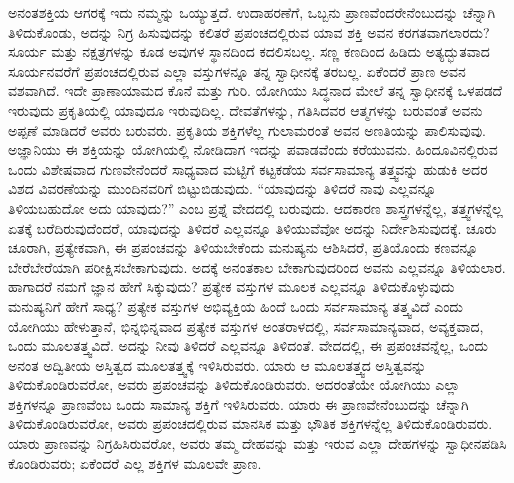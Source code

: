 ಅನಂತಶಕ್ತಿಯ ಆಗರಕ್ಕೆ ಇದು ನಮ್ಮನ್ನು ಒಯ್ಯುತ್ತದೆ. ಉದಾಹರಣೆಗೆ, ಒಬ್ಬನು ಪ್ರಾಣವೆಂದರೇನೆಂಬುದನ್ನು ಚೆನ್ನಾಗಿ ತಿಳಿದುಕೊಂಡು, ಅದನ್ನು ನಿಗ್ರ ಹಿಸುವುದನ್ನು ಕಲಿತರೆ ಪ್ರಪಂಚದಲ್ಲಿರುವ ಯಾವ ಶಕ್ತಿ ಅವನ ಕರಗತವಾಗಲಾರದು? ಸೂರ್ಯ ಮತ್ತು ನಕ್ಷತ್ರಗಳನ್ನು ಕೂಡ ಅವುಗಳ ಸ್ಥಾನದಿಂದ ಕದಲಿಸಬಲ್ಲ. ಸಣ್ಣ ಕಣದಿಂದ ಹಿಡಿದು ಅತ್ಯದ್ಭುತವಾದ ಸೂರ್ಯನವರೆಗೆ ಪ್ರಪಂಚದಲ್ಲಿರುವ ಎಲ್ಲಾ ವಸ್ತುಗಳನ್ನೂ ತನ್ನ ಸ್ವಾಧೀನಕ್ಕೆ ತರಬಲ್ಲ. ಏಕೆಂದರೆ ಪ್ರಾಣ ಅವನ ವಶವಾಗಿದೆ. ಇದೇ ಪ್ರಾಣಾಯಾಮದ ಕೊನೆ ಮತ್ತು ಗುರಿ. ಯೋಗಿಯು ಸಿದ್ಧನಾದ ಮೇಲೆ ತನ್ನ ಸ್ವಾಧೀನಕ್ಕೆ ಒಳಪಡದೆ ಇರುವುದು ಪ್ರಕೃತಿಯಲ್ಲಿ ಯಾವುದೂ ಇರುವುದಿಲ್ಲ. ದೇವತೆಗಳನ್ನು, ಗತಿಸಿದವರ ಆತ್ಮಗಳನ್ನು ಬರುವಂತೆ ಅವನು ಅಪ್ಪಣೆ ಮಾಡಿದರೆ ಅವರು ಬರುವರು. ಪ್ರಕೃತಿಯ ಶಕ್ತಿಗಳೆಲ್ಲ ಗುಲಾಮರಂತೆ ಅವನ ಅಣತಿಯನ್ನು ಪಾಲಿಸುವುವು. ಅಜ್ಞಾನಿಯು ಈ ಶಕ್ತಿಯನ್ನು ಯೋಗಿಯಲ್ಲಿ ನೋಡಿದಾಗ ಇದನ್ನು ಪವಾಡವೆಂದು ಕರೆಯುವನು. ಹಿಂದೂವಿನಲ್ಲಿರುವ ಒಂದು ವಿಶೇಷವಾದ ಗುಣವೇನೆಂದರೆ ಸಾಧ್ಯವಾದ ಮಟ್ಟಿಗೆ ಕಟ್ಟಕಡೆಯ ಸರ್ವಸಾಮಾನ್ಯ ತತ್ತ್ವವನ್ನು ಹುಡುಕಿ ಅದರ ವಿಶದ ವಿವರಣೆಯನ್ನು ಮುಂದಿನವರಿಗೆ ಬಿಟ್ಟುಬಿಡುವುದು. “ಯಾವುದನ್ನು ತಿಳಿದರೆ ನಾವು ಎಲ್ಲವನ್ನೂ ತಿಳಿಯಬಹುದೋ ಅದು ಯಾವುದು?” ಎಂಬ ಪ್ರಶ್ನೆ ವೇದದಲ್ಲಿ ಬರುವುದು. ಆದಕಾರಣ ಶಾಸ್ತ್ರಗಳನ್ನೆಲ್ಲ, ತತ್ತ್ವಗಳನ್ನೆಲ್ಲ ಏತಕ್ಕೆ ಬರೆದಿರುವುದೆಂದರೆ, ಯಾವುದನ್ನು ತಿಳಿದರೆ ಎಲ್ಲವನ್ನೂ ತಿಳಿಯುವೆವೋ ಅದನ್ನು ನಿರ್ದೇಶಿಸುವುದಕ್ಕೆ. ಚೂರು ಚೂರಾಗಿ, ಪ್ರತ್ಯೇಕವಾಗಿ, ಈ ಪ್ರಪಂಚವನ್ನು ತಿಳಿಯಬೇಕೆಂದು ಮನುಷ್ಯನು ಆಶಿಸಿದರೆ, ಪ್ರತಿಯೊಂದು ಕಣವನ್ನೂ ಬೇರೆಬೇರೆಯಾಗಿ ಪರೀಕ್ಷಿಸಬೇಕಾಗುವುದು. ಅದಕ್ಕೆ ಅನಂತಕಾಲ ಬೇಕಾಗುವುದರಿಂದ ಅವನು ಎಲ್ಲವನ್ನೂ ತಿಳಿಯಲಾರ. ಹಾಗಾದರೆ ನಮಗೆ ಜ್ಞಾನ ಹೇಗೆ ಸಿಕ್ಕುವುದು? ಪ್ರತ್ಯೇಕ ವಸ್ತುಗಳ ಮೂಲಕ ಎಲ್ಲವನ್ನೂ ತಿಳಿದುಕೊಳ್ಳುವುದು ಮನುಷ್ಯನಿಗೆ ಹೇಗೆ ಸಾಧ್ಯ? ಪ್ರತ್ಯೇಕ ವಸ್ತುಗಳ ಅಭಿವ್ಯಕ್ತಿಯ ಹಿಂದೆ ಒಂದು ಸರ್ವಸಾಮಾನ್ಯ ತತ್ತ್ವವಿದೆ ಎಂದು ಯೋಗಿಯು ಹೇಳುತ್ತಾನೆ, ಭಿನ್ನಭಿನ್ನವಾದ ಪ್ರತ್ಯೇಕ ವಸ್ತುಗಳ ಅಂತರಾಳದಲ್ಲಿ, ಸರ್ವಸಾಮಾನ್ಯವಾದ, ಅವ್ಯಕ್ತವಾದ, ಒಂದು ಮೂಲತತ್ತ್ವವಿದೆ. ಅದನ್ನು ನೀವು ತಿಳಿದರೆ ಎಲ್ಲವನ್ನೂ ತಿಳಿದಂತೆ. ವೇದದಲ್ಲಿ, ಈ ಪ್ರಪಂಚವನ್ನೆಲ್ಲ, ಒಂದು ಅನಂತ ಅದ್ವಿತೀಯ ಅಸ್ತಿತ್ವದ ಮೂಲತತ್ತ್ವಕ್ಕೆ ಇಳಿಸಿರುವರು. ಯಾರು ಆ ಮೂಲತತ್ತ್ವದ ಅಸ್ತಿತ್ವವನ್ನು ತಿಳಿದುಕೊಂಡಿರುವರೋ, ಅವರು ಪ್ರಪಂಚವನ್ನು ತಿಳಿದುಕೊಂಡಿರುವರು. ಅದರಂತೆಯೇ ಯೋಗಿಯು ಎಲ್ಲಾ ಶಕ್ತಿಗಳನ್ನೂ ಪ್ರಾಣವೆಂಬ ಒಂದು ಸಾಮಾನ್ಯ ಶಕ್ತಿಗೆ ಇಳಿಸಿರುವರು. ಯಾರು ಈ ಪ್ರಾಣವೇನೆಂಬುದನ್ನು ಚೆನ್ನಾಗಿ ತಿಳಿದುಕೊಂಡಿರುವರೋ, ಅವರು ಪ್ರಪಂಚದಲ್ಲಿರುವ ಮಾನಸಿಕ ಮತ್ತು ಭೌತಿಕ ಶಕ್ತಿಗಳನ್ನೆಲ್ಲ ತಿಳಿದುಕೊಂಡಿರುವರು. ಯಾರು ಪ್ರಾಣವನ್ನು ನಿಗ್ರಹಿಸಿರುವರೋ, ಅವರು ತಮ್ಮ ದೇಹವನ್ನು ಮತ್ತು ಇರುವ ಎಲ್ಲಾ ದೇಹಗಳನ್ನು ಸ್ವಾಧೀನಪಡಿಸಿ ಕೊಂಡಿರುವರು; ಏಕೆಂದರೆ ಎಲ್ಲ ಶಕ್ತಿಗಳ ಮೂಲವೇ ಪ್ರಾಣ. 

